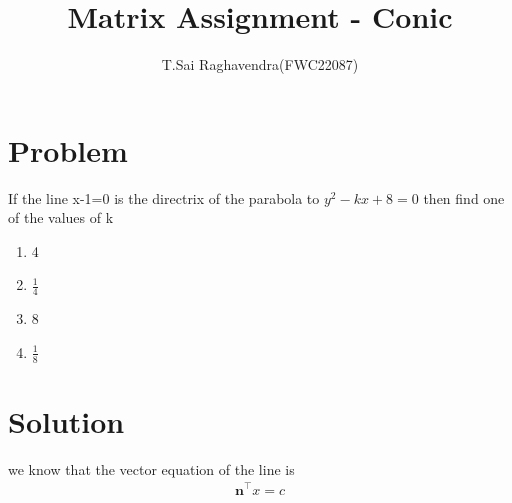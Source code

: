 \documentclass[journal,12pt,twocolumn]{IEEEtran}
\title{\mytitle}
\title{
Matrix Assignment - Conic
}
\author{T.Sai Raghavendra(FWC22087)}
\let\vec\mathbf
\begin{document}
\maketitle
\tableofcontents
\bigskip


\section{\textbf{Problem}}
If the line x-1=0 is the directrix of the parabola to $y^2-kx+8=0$ then find one of the values of k
\begin{enumerate}
\item 4
\item $\frac{1}{4}$
\item 8
\item $\frac{1}{8}$
\end{enumerate}


\section{\textbf{Solution}}

we know that the vector equation of the line is 
\begin{align}
\label{eq:one}
\vec{n}^\top x = c
\end{align}
\end{document}
